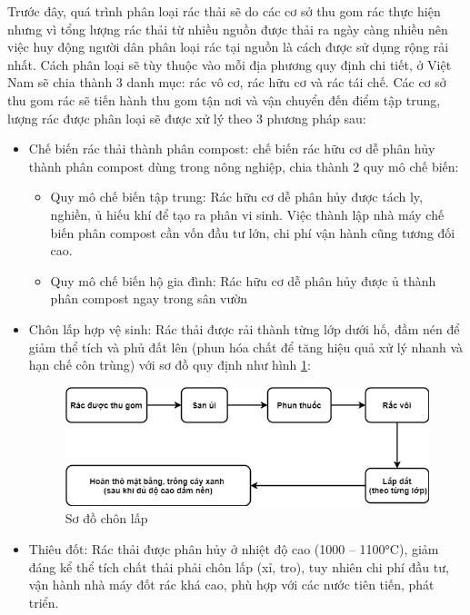 Trước đây, quá trình phân loại rác thải sẽ do các cơ sở thu gom rác thực hiện nhưng vì tổng lượng rác thải từ nhiều nguồn được thải ra ngày càng nhiều nên việc huy động người dân phân loại rác tại nguồn là cách được sử dụng rộng rải nhất. Cách phân loại sẽ tùy thuộc vào mỗi địa phương quy định chi tiết, ở Việt Nam sẽ chia thành 3 danh mục: rác vô cơ, rác hữu cơ và rác tái chế. Các cơ sở thu gom rác sẽ tiến hành thu gom tận nơi và vận chuyển đến điểm tập trung, lượng rác được phân loại sẽ được xử lý theo 3 phương pháp sau:
\begin{itemize}
    \item Chế biến rác thải thành phân compost: chế biến rác hữu cơ dễ phân hủy thành phân compost dùng trong nông nghiệp, chia thành 2 quy mô chế biến:
        \begin{itemize}
            \item Quy mô chế biến tập trung: Rác hữu cơ dễ phân hủy được tách ly, nghiền, ủ hiếu khí để tạo ra phân vi sinh. Việc thành lập nhà máy chế biến phân compost cần vốn đầu tư lớn, chi phí vận hành cũng tương đối cao.
            \item  Quy mô chế biến hộ gia đình: Rác hữu cơ dễ phân hủy được ủ thành phân compost ngay trong sân vườn
        \end{itemize}

    \item Chôn lấp hợp vệ sinh: Rác thải được rải thành từng lớp dưới hố, đầm nén để giảm thể tích và phủ đất lên (phun  hóa chất để tăng hiệu quả xử lý nhanh và hạn chế côn trùng) với sơ đồ quy định như hình \ref{fig:so_do_chon_lap}:
    
        \begin{figure}[H]
            \centering            
            \includegraphics[width=\textwidth]{images/SoDoChonLap.png}
            \caption{Sơ đồ chôn lấp \cite{trashclassification}}
            \label{fig:so_do_chon_lap}
        \end{figure}

    \item Thiêu đốt: Rác thải được phân hủy ở nhiệt độ cao (1000 – 1100°C), giảm đáng kể thể tích chất thải phải chôn lấp (xỉ, tro), tuy nhiên chi phí đầu tư, vận hành nhà máy đốt rác khá cao, phù hợp với các nước tiên tiến, phát triển. 
   

\end{itemize}
